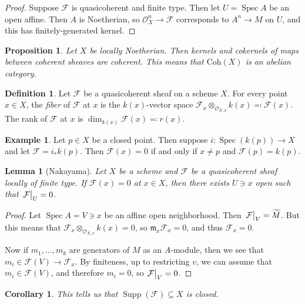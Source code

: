 \documentclass[leqno, openany]{memoir}
\newtheorem{cor}[thm]{Corollary}
\newtheorem{prop}[thm]{Proposition}
\newtheorem{lem}[thm]{Lemma}
\theoremstyle{definition}
\newtheorem{defn}[thm]{Definition}
\newtheorem{exm}[thm]{Example}
\theoremstyle{remark}
\theoremstyle{plain}
\theoremstyle{definition}
\theoremstyle{remark}
\newcommand{\mc}[1]{\mathcal{#1}}
\newcommand{\mf}[1]{\mathfrak{#1}}
\newcommand{\mr}[1]{\mathrm{#1}}
\newcommand{\wt}[1]{\widetilde{#1}}
\DeclareMathOperator{\Supp}{Supp}
\DeclareMathOperator{\Spec}{Spec}
\begin{document}
\begin{proof}
    Suppose $\mc{F}$ is quasicoherent and finite type. Then let $U = \Spec A$ be an open affine. Then $A$ is Noetherian, so $\mc{O}_X^n \to \mc{F}$ corresponds to $A^n \to M$ on $U$, and this has finitely-generated kernel.
\end{proof}

\begin{prop}
    Let $X$ be locally Noetherian. Then kernels and cokernels of maps between coherent sheaves are coherent. This means that $\mr{Coh}(X)$ is an abelian category.
\end{prop}

\begin{defn}
    Let $\mc{F}$ be a quasicoherent sheaf on a scheme $X$. For every point $x \in X$, the \textit{fiber} of $\mc{F}$ at $x$ is the $k(x)$-vector space $\mc{F}_x \otimes_{\mc{O}_{X,x}} k(x) \eqqcolon \mc{F}(x)$. The rank of $\mc{F}$ at $x$ is $\dim_{k(x)} \mc{F}(x) \eqqcolon r(x)$.
\end{defn}

\begin{exm}
    Let $p \in X$ be a closed point. Then suppose $i \colon \Spec (k(p)) \to X$ and let $\mc{F}  = i_* k(p)$. Then $\mc{F}(x) = 0$ if and only if $x \neq p$ and $\mc{F}(p) = k(p)$.
\end{exm}

\begin{lem}[Nakayama]
    Let $X$ be a scheme and $\mc{F}$ be a quasicoherent sheaf locally of finite type. If $\mc{F}(x) = 0$ at $x \in X$, then there exists $U \ni x$ open such that $\eval{\mc{F}}_U = 0$.
\end{lem}

\begin{proof}
    Let $\Spec A = V \ni x$ be an affine open neighborhood. Then $\eval{\mc{F}}_V = \wt{M}$. But this means that $\mc{F}_x \otimes_{\mc{O}_{X,x}} k(x) = 0$, so $\mf{m}_x \mc{F}_x = 0$, and thus $\mc{F}_x = 0$.

    Now if $m_1, \ldots, m_k$ are generators of $M$ as an $A$-module, then we see that $m_i \in \mc{F}(V) \to \mc{F}_x$. By finiteness, up to restricting $v$, we can assume that $m_i \in \mc{F}(V)$, and therefore $m_i = 0$, so $\eval{\mc{F}}_V = 0$.
\end{proof}

\begin{cor}
    This tells us that $\Supp (\mc{F}) \subseteq X$ is closed.
\end{cor}
\end{document}
